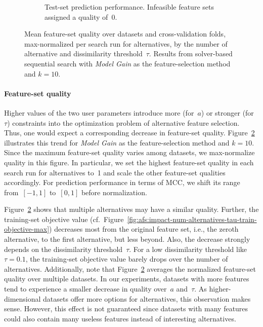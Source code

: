\documentclass{article}
\theoremstyle{definition}
\begin{document}
\begin{figure}[p]
\begin{subfigure}[t]{0.48\textwidth}
		\caption{
			Test-set prediction performance.
			Infeasible feature sets assigned a quality of~0.
		}
		\label{fig:afs:impact-num-alternatives-tau-decision-tree-test-mcc-max-fillna}
	\end{subfigure}
	\caption{
		Mean feature-set quality over datasets and cross-validation folds, max-normalized per search run for alternatives, by the number of alternative and dissimilarity threshold~$\tau$.
		Results from solver-based sequential search with \emph{Model Gain} as the feature-selection method and $k=10$.
	}
	\label{fig:afs:impact-num-alternatives-tau-quality}
\end{figure}

\paragraph{Feature-set quality}

Higher values of the two user parameters introduce more (for~$a$) or stronger (for~$\tau$) constraints into the optimization problem of alternative feature selection.
Thus, one would expect a corresponding decrease in feature-set quality.
Figure~\ref{fig:afs:impact-num-alternatives-tau-quality} illustrates this trend for \emph{Model Gain} as the feature-selection method and $k=10$.
Since the maximum feature-set quality varies among datasets, we max-normalize quality in this figure.
In particular, we set the highest feature-set quality in each search run for alternatives to~1 and scale the other feature-set qualities accordingly.
For prediction performance in terms of MCC, we shift its range from~$[-1,1]$ to~$[0,1]$ before normalization.

Figure~\ref{fig:afs:impact-num-alternatives-tau-quality} shows that multiple alternatives may have a similar quality.
Further, the training-set objective value (cf.~Figure~\ref{fig:afs:impact-num-alternatives-tau-train-objective-max}) decreases most from the original feature set, i.e., the zeroth alternative, to the first alternative, but less beyond.
Also, the decrease strongly depends on the dissimilarity threshold~$\tau$.
For a low dissimilarity threshold like $\tau=0.1$, the training-set objective value barely drops over the number of alternatives.
Additionally, note that Figure~\ref{fig:afs:impact-num-alternatives-tau-quality} averages the normalized feature-set quality over multiple datasets.
In our experiments, datasets with more features tend to experience a smaller decrease in quality over~$a$ and~$\tau$.
As higher-dimensional datasets offer more options for alternatives, this observation makes sense.
However, this effect is not guaranteed since datasets with many features could also contain many useless features instead of interesting alternatives.
\end{document}
